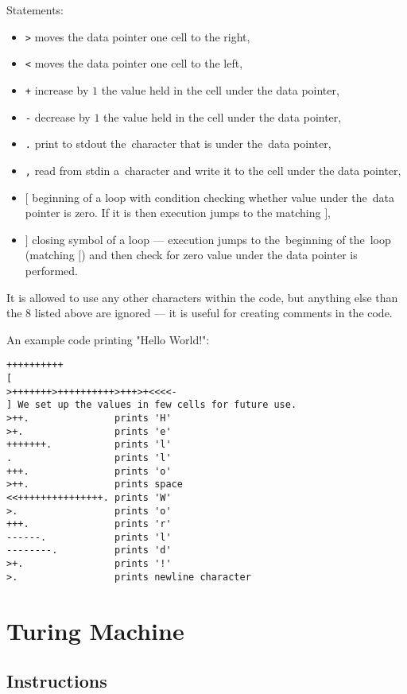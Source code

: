 \documentclass[english,shortabstract,mgr]{iithesis}
\begin{document}
Statements:
\begin{itemize}
  \item \texttt{>} moves the data pointer one cell to the right,
  \item \texttt{<} moves the data pointer one cell to the left,
  \item \texttt{+} increase by $1$ the value held in the cell under the data pointer,
  \item \texttt{-} decrease by $1$ the value held in the cell under the data pointer,
  \item \texttt{.} print to stdout the~character that is under the~data pointer,
  \item \texttt{,} read from stdin a~character and write it to the cell under the data pointer,
  \item \texttt{$[$} beginning of a loop with condition checking whether value under
      the~data pointer is zero. If it is then execution jumps to the matching $]$,
  \item \texttt{$]$} closing symbol of a loop --- execution jumps to the~beginning of the~loop
      (matching $[$) and then check for zero value under the data pointer is performed.
\end{itemize}

It is allowed to use any other characters within the code, but anything else than the $8$
listed above are ignored --- it is useful for creating comments in the code.

An example code printing "Hello World!":
\begin{verbatim}
++++++++++
[
>+++++++>++++++++++>+++>+<<<<-
] We set up the values in few cells for future use.
>++.               prints 'H'
>+.                prints 'e'
+++++++.           prints 'l'
.                  prints 'l'
+++.               prints 'o'
>++.               prints space
<<+++++++++++++++. prints 'W'
>.                 prints 'o'
+++.               prints 'r'
------.            prints 'l'
--------.          prints 'd'
>+.                prints '!'
>.                 prints newline character
\end{verbatim}

\section {Turing Machine}

\subsection {Instructions}
\end{document}
